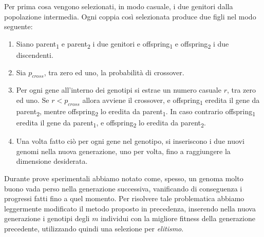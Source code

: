 \documentclass[a4paper,12pt]{article}
\begin{document}
Per prima cosa vengono selezionati, in modo casuale, i due genitori dalla popolazione intermedia. Ogni coppia così selezionata produce due figli nel modo seguente: 
\begin{enumerate}
	\item Siano parent\textsubscript{1} e parent\textsubscript{2} i due genitori e offspring\textsubscript{1} e offspring\textsubscript{2} i due discendenti.
	\item Sia $p_{cross}$, tra zero ed uno, la probabilità di crossover.
	\item Per ogni gene all'interno dei genotipi si estrae un numero casuale $r$, tra zero ed uno. Se $r < p_{cross}$ allora avviene il crossover, e offspring\textsubscript{1} eredita il gene da parent\textsubscript{2}, mentre offspring\textsubscript{2} lo eredita da parent\textsubscript{1}. In caso contrario offspring\textsubscript{1} eredita il gene da parent\textsubscript{1}, e offspring\textsubscript{2} lo eredita da parent\textsubscript{2}.
	\item Una volta fatto ciò per ogni gene nel genotipo, si inseriscono i due nuovi genomi nella nuova generazione, uno per volta, fino a raggiungere la dimensione desiderata. 
\end{enumerate}
Durante prove sperimentali abbiamo notato come, spesso, un genoma molto buono vada perso nella generazione successiva, vanificando di conseguenza i progressi fatti fino a quel momento. Per risolvere tale problematica abbiamo leggermente modificato il metodo proposto in precedenza, inserendo nella nuova generazione i genotipi degli $m$ individui con la migliore fitness della generazione precedente, utilizzando quindi una selezione per \emph{elitismo}.
\end{document}
